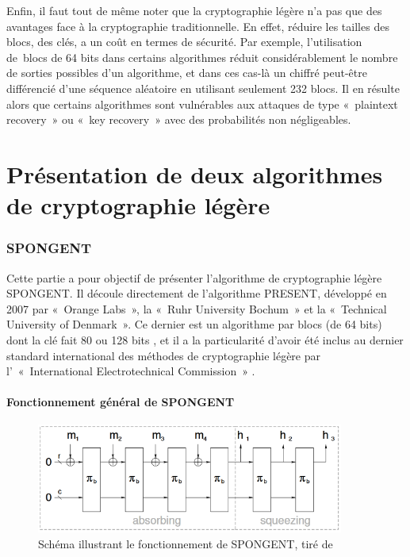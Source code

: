 			Enfin, il faut tout de même noter que la cryptographie légère n’a pas que des
		avantages face à la cryptographie traditionnelle. En effet, réduire les
		tailles des blocs, des clés, a un coût en termes de sécurité. Par exemple,
		l’utilisation de blocs de 64 bits dans certains algorithmes réduit
		considérablement le nombre de sorties possibles d’un algorithme, et dans ces
		cas-là un chiffré peut-être différencié d’une séquence aléatoire en utilisant
		seulement 232 blocs. Il en résulte alors que certains algorithmes sont
		vulnérables aux attaques de type « plaintext recovery » ou « key recovery »
		avec des probabilités non négligeables.

\part{Présentation de deux algorithmes de cryptographie légère}

	\section{SPONGENT}

			Cette partie a pour objectif de présenter l’algorithme de cryptographie légère
		SPONGENT. Il découle directement de l’algorithme PRESENT, développé en 2007
		par « Orange Labs », la « Ruhr University Bochum » et la « Technical
		University of Denmark ». Ce dernier est un algorithme par blocs (de 64 bits)
		dont la clé fait 80 ou 128 bits \cite{PRESENT}, et il a la particularité
		d’avoir été inclus au dernier standard international des méthodes de
		cryptographie légère par l’ « International Electrotechnical Commission »
		\cite{ultraLightURL}.

		\subsection{Fonctionnement général de SPONGENT}

			\begin{figure}[!h]
				 	\centering
				 	\includegraphics[width=0.9\textwidth]{imgs/Spongent/fctGlobalSpongent.png}
				 	\caption{Schéma illustrant le fonctionnement de SPONGENT, tiré de \cite{6275435}}
				 	\label{fctGlobalSpongent}
			\end{figure}

